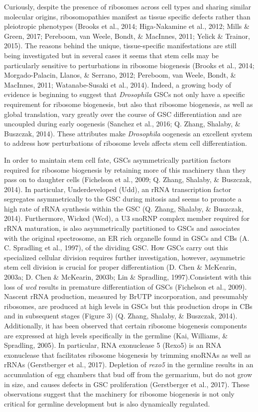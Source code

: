 \documentclass[12pt,oneside]{reedthesis}
\begin{document}
Curiously, despite the presence of ribosomes across cell types and
sharing similar molecular origins, ribosomopathies manifest as tissue
specific defects rather than pleiotropic phenotypes (Brooks et al., 2014; Higa-Nakamine et al., 2012; Mills \& Green, 2017; Pereboom, van Weele, Bondt, \& MacInnes, 2011; Yelick \& Trainor, 2015).
The reasons behind the unique, tissue-specific manifestations are still
being investigated but in several cases it seems that stem cells may be
particularly sensitive to perturbations in ribosome biogenesis
(Brooks et al., 2014; Morgado-Palacin, Llanos, \& Serrano, 2012; Pereboom, van Weele, Bondt, \& MacInnes, 2011; Watanabe-Susaki et al., 2014). Indeed, a growing body of evidence is beginning
to suggest that \emph{Drosophila} GSCs not only have a specific requirement
for ribosome biogenesis, but also that ribosome biogenesis, as well as
global translation, vary greatly over the course of GSC differentiation
and are uncoupled during early oogenesis (Sanchez et al., 2016; Q. Zhang, Shalaby, \& Buszczak, 2014). These attributes make \emph{Drosophila} oogenesis an
excellent system to address how perturbations of ribosome levels affects
stem cell differentiation.

In order to maintain stem cell fate, GSCs asymmetrically partition
factors required for ribosome biogenesis by retaining more of this
machinery than they pass on to daughter cells (Fichelson et al., 2009; Q. Zhang, Shalaby, \& Buszczak, 2014). In particular, Underdeveloped (Udd), an rRNA
transcription factor segregates asymmetrically to the GSC during mitosis
and seems to promote a high rate of rRNA synthesis within the GSC
(Q. Zhang, Shalaby, \& Buszczak, 2014). Furthermore, Wicked (Wcd), a U3 snoRNP complex member
required for rRNA maturation, is also asymmetrically partitioned to GSCs
and associates with the original spectrosome, an ER rich organelle found
in GSCs and CBs (A. C. Spradling et al., 1997), of the dividing GSC. How GSCs
carry out this specialized cellular division requires further
investigation, however, asymmetric stem cell division is crucial for
proper differentiation (D. Chen \& McKearin, 2003a; D. Chen \& McKearin, 2003b; Lin \& Spradling, 1997).Consistent with this loss of \emph{wcd} results in premature
differentiation of GSCs (Fichelson et al., 2009). Nascent rRNA production,
measured by BrUTP incorporation, and presumably ribosomes, are produced
at high levels in GSCs but this production drops in CBs and in
subsequent stages (Figure 3) (Q. Zhang, Shalaby, \& Buszczak, 2014). Additionally, it has been
observed that certain ribosome biogenesis components are expressed at
high levels specifically in the germline (Kai, Williams, \& Spradling, 2005). In particular,
RNA exonuclease 5 (Rexo5) is an RNA exonuclease that facilitates
ribosome biogenesis by trimming snoRNAs as well as rRNAs
(Gerstberger et al., 2017). Depletion of \emph{rexo5} in the germline results in
an accumulation of egg chambers that bud off from the germarium, but do
not grow in size, and causes defects in GSC proliferation
(Gerstberger et al., 2017). These observations suggest that the machinery for
ribosome biogenesis is not only critical for germline development but is
also dynamically regulated.
\end{document}
